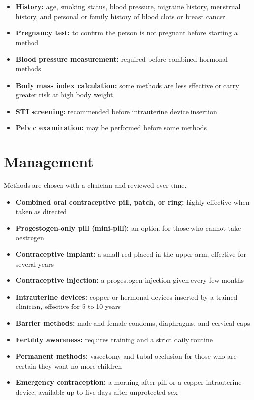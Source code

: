 \begin{itemize}
    \item \textbf{History:} age, smoking status, blood pressure, migraine history, menstrual history, and personal or family history of blood clots or breast cancer
    \item \textbf{Pregnancy test:} to confirm the person is not pregnant before starting a method
    \item \textbf{Blood pressure measurement:} required before combined hormonal methods
    \item \textbf{Body mass index calculation:} some methods are less effective or carry greater risk at high body weight
    \item \textbf{STI screening:} recommended before intrauterine device insertion
    \item \textbf{Pelvic examination:} may be performed before some methods
\end{itemize}

\section*{Management}
Methods are chosen with a clinician and reviewed over time.

\begin{itemize}
    \item \textbf{Combined oral contraceptive pill, patch, or ring:} highly effective when taken as directed
    \item \textbf{Progestogen-only pill (mini-pill):} an option for those who cannot take oestrogen
    \item \textbf{Contraceptive implant:} a small rod placed in the upper arm, effective for several years
    \item \textbf{Contraceptive injection:} a progestogen injection given every few months
    \item \textbf{Intrauterine devices:} copper or hormonal devices inserted by a trained clinician, effective for 5 to 10 years
    \item \textbf{Barrier methods:} male and female condoms, diaphragms, and cervical caps
    \item \textbf{Fertility awareness:} requires training and a strict daily routine
    \item \textbf{Permanent methods:} vasectomy and tubal occlusion for those who are certain they want no more children
    \item \textbf{Emergency contraception:} a morning-after pill or a copper intrauterine device, available up to five days after unprotected sex
\end{itemize}

